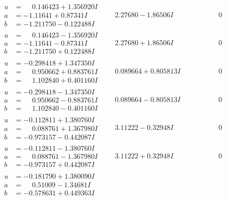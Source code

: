 \documentclass[1p]{elsarticle_modified}
\theoremstyle{definition}
\begin{document}
$$\begin{array}{c|c|c}
\begin{aligned}
u &= \phantom{-}0.146423 + 1.356920 I \\
a &= -1.11641 + 0.87341 I \\
b &= -1.211750 - 0.122488 I\end{aligned}
 & \phantom{-}2.27680 - 1.86506 I & \phantom{-0.000000 } 0 \\ \hline\begin{aligned}
u &= \phantom{-}0.146423 - 1.356920 I \\
a &= -1.11641 - 0.87341 I \\
b &= -1.211750 + 0.122488 I\end{aligned}
 & \phantom{-}2.27680 + 1.86506 I & \phantom{-0.000000 } 0 \\ \hline\begin{aligned}
u &= -0.298418 + 1.347350 I \\
a &= \phantom{-}0.950662 + 0.883761 I \\
b &= \phantom{-}1.102840 + 0.401160 I\end{aligned}
 & \phantom{-}0.089664 + 0.805813 I & \phantom{-0.000000 } 0 \\ \hline\begin{aligned}
u &= -0.298418 - 1.347350 I \\
a &= \phantom{-}0.950662 - 0.883761 I \\
b &= \phantom{-}1.102840 - 0.401160 I\end{aligned}
 & \phantom{-}0.089664 - 0.805813 I & \phantom{-0.000000 } 0 \\ \hline\begin{aligned}
u &= -0.112811 + 1.380760 I \\
a &= \phantom{-}0.088761 + 1.367980 I \\
b &= -0.973157 - 0.442087 I\end{aligned}
 & \phantom{-}3.11222 - 0.32948 I & \phantom{-0.000000 } 0 \\ \hline\begin{aligned}
u &= -0.112811 - 1.380760 I \\
a &= \phantom{-}0.088761 - 1.367980 I \\
b &= -0.973157 + 0.442087 I\end{aligned}
 & \phantom{-}3.11222 + 0.32948 I & \phantom{-0.000000 } 0 \\ \hline\begin{aligned}
u &= -0.181790 + 1.380090 I \\
a &= \phantom{-}0.51009 - 1.34681 I \\
b &= -0.578631 + 0.449363 I\end{aligned}

\end{array}$$
\end{document}
